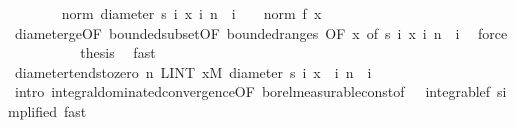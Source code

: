 \begin{isabellebody}
\ \ \ \ \ \ \isamarkupfalse%
\ {\isachardoublequoteopen}norm\ {\isacharparenleft}{\kern0pt}diameter\ {\isacharbraceleft}{\kern0pt}s\ i\ x\ {\isacharbar}{\kern0pt}i{\isachardot}{\kern0pt}\ n\ {\isasymle}\ i{\isacharbraceright}{\kern0pt}{\isacharparenright}{\kern0pt}\ {\isasymle}\ {}\ {\isacharasterisk}{\kern0pt}\ norm\ {\isacharparenleft}{\kern0pt}f\ x{\isacharparenright}{\kern0pt}{\isachardoublequoteclose}\ \isamarkupfalse%
\ diameter{\isacharunderscore}{\kern0pt}ge{\isacharunderscore}{\kern0pt}{}{\isacharbrackleft}{\kern0pt}OF\ bounded{\isacharunderscore}{\kern0pt}subset{\isacharbrackleft}{\kern0pt}OF\ bounded{\isacharunderscore}{\kern0pt}range{\isacharunderscore}{\kern0pt}s{\isacharbrackright}{\kern0pt}{\isacharcomma}{\kern0pt}\ OF\ x{\isacharcomma}{\kern0pt}\ of\ {\isachardoublequoteopen}{\isacharbraceleft}{\kern0pt}s\ i\ x\ {\isacharbar}{\kern0pt}i{\isachardot}{\kern0pt}\ n\ {\isasymle}\ i{\isacharbraceright}{\kern0pt}{\isachardoublequoteclose}{\isacharbrackright}{\kern0pt}\ \isamarkupfalse%
\ force\isanewline
\ \ \ \ \isacommand{{\isacharbraceright}{\kern0pt}}\isamarkupfalse%
\isanewline
\ \ \ \ \isamarkupfalse%
\ {\isacharquery}{\kern0pt}thesis\ \isamarkupfalse%
\ fast\isanewline
\ \ \isamarkupfalse%
\isanewline
\ \ \isamarkupfalse%
\ \isamarkupfalse%
\ diameter{\isacharunderscore}{\kern0pt}tendsto{\isacharunderscore}{\kern0pt}zero{\isacharcolon}{\kern0pt}\ {\isachardoublequoteopen}{\isacharparenleft}{\kern0pt}{\isasymlambda}n{\isachardot}{\kern0pt}\ LINT\ x{\isacharbar}{\kern0pt}M{\isachardot}{\kern0pt}\ diameter\ {\isacharbraceleft}{\kern0pt}s\ i\ x\ {\isacharbar}{\kern0pt}\ i{\isachardot}{\kern0pt}\ n\ {\isasymle}\ i{\isacharbraceright}{\kern0pt}{\isacharparenright}{\kern0pt}\ {\isasymlonglonglongrightarrow}\ {}{\isachardoublequoteclose}\ \isamarkupfalse%
\ {\isacharparenleft}{\kern0pt}intro\ integral{\isacharunderscore}{\kern0pt}dominated{\isacharunderscore}{\kern0pt}convergence{\isacharbrackleft}{\kern0pt}OF\ borel{\isacharunderscore}{\kern0pt}measurable{\isacharunderscore}{\kern0pt}const{\isacharbrackleft}{\kern0pt}of\ {}{\isacharbrackright}{\kern0pt}\ {\isacharunderscore}{\kern0pt}\ integrable{\isacharunderscore}{\kern0pt}{}f{\isacharcomma}{\kern0pt}\ simplified{\isacharbrackright}{\kern0pt}{\isacharparenright}{\kern0pt}\ {\isacharparenleft}{\kern0pt}fast{\isacharplus}{\kern0pt}{\isacharparenright}{\kern0pt}\isanewline
\ \ \isanewline

\end{isabellebody}
